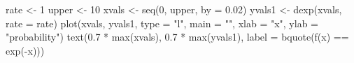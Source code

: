 \begin{Schunk}
\begin{Sinput}
 rate <- 1
 upper <- 10
 xvals <- seq(0, upper, by = 0.02)
 yvals1 <- dexp(xvals, rate = rate)
 plot(xvals, yvals1, type = "l", main = "", xlab = "x", ylab = "probability")
 text(0.7 * max(xvals), 0.7 * max(yvals1), label = bquote(f(x) == exp(-x)))
\end{Sinput}
\end{Schunk}
